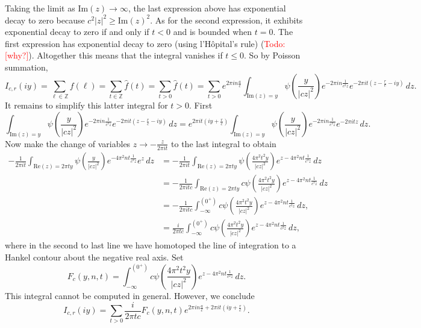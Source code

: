 \documentclass[12pt]{book}
\theoremstyle{definition}\newframedtheorem{method}{Method}
\newcommand{\Z}{\mathbb{Z}}
\newcommand{\<}{\langle}
\renewcommand{\>}{\rangle}
\renewcommand{\Re}{\mathrm{Re}}
\renewcommand{\Im}{\mathrm{Im}}
\newcommand{\todo}[1]{\textcolor{red}{\sf Todo: [#1]}}
\begin{document}
      Taking the limit as $\Im(z) \to \infty$, the last expression above has exponential decay to zero because $c^{2}|z|^{2} \ge \Im(z)^{2}$. As for the second expression, it exhibits exponential decay to zero if and only if $t < 0$ and is bounded when $t = 0$. The first expression has exponential decay to zero (using l'H\^opital's rule) (\todo{why?}). Altogether this means that the integral vanishes if $t \le 0$. So by Poisson summation,
      \[
        I_{c,r}(iy) = \sum_{\ell \in \Z}f(\ell) = \sum_{t \in \Z}\hat{f}(t) = \sum_{t > 0}\hat{f}(t) = \sum_{t > 0}e^{2\pi in\frac{a}{c}}\int_{\Im(z) = y}\psi\left(\frac{y}{|cz|^{2}}\right)e^{-2\pi in\frac{1}{c^{2}z}}e^{-2\pi it\left(z-\frac{r}{c}-iy\right)}\,dz.
      \]
      It remains to simplify this latter integral for $t > 0$. First
      \[
        \int_{\Im(z) = y}\psi\left(\frac{y}{|cz|^{2}}\right)e^{-2\pi in\frac{1}{c^{2}z}}e^{-2\pi it\left(z-\frac{r}{c}-iy\right)}\,dz = e^{2\pi it\left(iy+\frac{r}{c}\right)}\int_{\Im(z) = y}\psi\left(\frac{y}{|cz|^{2}}\right)e^{-2\pi in\frac{1}{c^{2}z}}e^{-2\pi itz}\,dz.
      \]
      Now make the change of variables $z \to -\frac{z}{2\pi it}$ to the last integral to obtain
      \begin{align*}
        -\frac{1}{2\pi it}\int_{\Re(z) = 2\pi ty}\psi\left(\frac{y}{|cz|^{2}}\right)e^{-4\pi^{2}nt\frac{1}{c^{2}z}}e^{z}\,dz &= -\frac{1}{2\pi it}\int_{\Re(z) = 2\pi ty}\psi\left(\frac{4\pi^{2}t^{2}y}{|cz|^{2}}\right)e^{z-4\pi^{2}nt\frac{1}{c^{2}z}}\,dz \\
        &= -\frac{1}{2\pi itc}\int_{\Re(z) = 2\pi ty}c\psi\left(\frac{4\pi^{2}t^{2}y}{|cz|^{2}}\right)e^{z-4\pi^{2}nt\frac{1}{c^{2}z}}\,dz \\
        &= -\frac{1}{2\pi itc}\int_{-\infty}^{(0^{+})}c\psi\left(\frac{4\pi^{2}t^{2}y}{|cz|^{2}}\right)e^{z-4\pi^{2}nt\frac{1}{c^{2}z}}\,dz, \\
        &= \frac{i}{2\pi tc}\int_{-\infty}^{(0^{+})}c\psi\left(\frac{4\pi^{2}t^{2}y}{|cz|^{2}}\right)e^{z-4\pi^{2}nt\frac{1}{c^{2}z}}\,dz,
      \end{align*}
      where in the second to last line we have homotoped the line of integration to a Hankel contour about the negative real axis. Set
      \[
        F_{c}(y,n,t) = \int_{-\infty}^{(0^{+})}c\psi\left(\frac{4\pi^{2}t^{2}y}{|cz|^{2}}\right)e^{z-4\pi^{2}nt\frac{1}{c^{2}z}}\,dz.
      \]
      This integral cannot be computed in general. However, we conclude
      \[
        I_{c,r}(iy) = \sum_{t > 0}\frac{i}{2\pi tc}F_{c}(y,n,t)e^{2\pi in\frac{a}{c}+2\pi it\left(iy+\frac{r}{c}\right)}.
      \]
\end{document}
